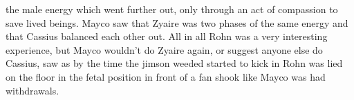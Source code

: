 \documentclass[12pt]{book}
\begin{document}
the male energy which went further out, only through an act of compassion to save lived beings. Mayco saw that Zyaire was two phases of the same energy and that Cassius balanced each other out. All in all Rohn was a very interesting experience, but Mayco wouldn't do Zyaire again, or suggest anyone else do Cassius, saw as by the time the jimson weeded started to kick in Rohn was lied on the floor in the fetal position in front of a fan shook like Mayco was had withdrawals.
\end{document}
